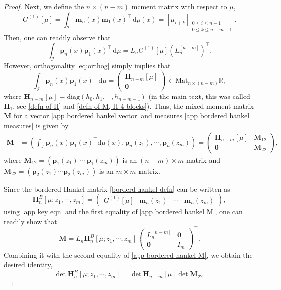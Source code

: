 \documentclass[a4paper,10pt,leqno]{amsart}
\numberwithin{equation}{section}
\theoremstyle{remark}
\newcommand{\dd}{\mathrm{d}}
\newcommand{\R}{\mathbb{R}}
\begin{document}
\begin{proof}
Next, we define the $n \times (n-m)$ moment matrix with respect to $\mu$,
\[
G^{(1)}[\mu] = \int_{\mathscr I} \bm m_n (x)\bm m_{1} (x)^\top\,\dd\mu(x)=[\mu_{i+k}]_{\substack{0\le i\le n-1\\ 0\le k\le n-m-1}}.
\]
Then, one can readily observe that 
\begin{equation} \label{app key eqn}
\int_{\mathscr I} \bm p_n (x) \bm p_{1} (x)^\top \,\dd\mu = L_n G^{(1)}[\mu] \left( L_n^{[n-m]} \right)^\top.
\end{equation}
However, orthogonality \eqref{eq:orthog} simply implies that
\[
\int_{\mathscr I} \bm p_n (x) \bm p_{1} (x)^\top \,\dd\mu = \begin{pmatrix}
    \bm{H}_{n-m}[\mu]\\
    \bm{0}
\end{pmatrix} \in \mathrm{Mat}_{n \times (n-m)} \R,
\]
where \(\bm{H}_{n-m}[\mu] = \mathrm{diag}(h_0, h_1, \cdots, h_{n-m-1})\) (in the main text, this was called $\bm H_1$, see \eqref{defn of H} and \eqref{defn of M, H 4 blocks}).
Thus, the mixed-moment matrix $\bm{M}$ for a vector \eqref{app bordered hankel vector} and measures \eqref{app bordered hankel measures} is given by
\begin{align} \label{app bordered hankel M}
\bm{M} &= \left(\int_{\mathscr I} \bm p_n(x) \bm p_{1}(x)^\top \dd\mu(x), \bm p_n(z_1), \cdots, \bm p_n (z_m) \right) = \begin{pmatrix}
\bm H_{n-m}[\mu] & \bm M_{12} \\[2pt]
\bm 0    & \bm M_{22}
\end{pmatrix},
\end{align}
where $\bm M_{12} = \left(\bm p_1(z_1)\ \cdots\ \bm p_1(z_m)\right)$ is an $(n-m) \times m$ matrix and $\bm M_{22} = \left(\bm p_2(z_1) \cdots \bm p_2(z_m)\right)$ is an $m \times m$ matrix.

Since the bordered Hankel matrix \eqref{borderd hankel defn} can be written as
\[
\bm H_n^{B}[\mu;z_1,\cdots,z_m]
= \begin{pmatrix} G^{(1)}[\mu] & \bm m_n (z_1) & \cdots & \bm m_n (z_m)\end{pmatrix},
\]
using \eqref{app key eqn} and the first equality of \eqref{app bordered hankel M}, one can readily show that
\begin{equation}
\bm{M} = L_n \bm H_n^{B}[\mu;z_1,\cdots,z_m]\
\begin{pmatrix}
L_n^{[n-m]} & \bm 0\\
\bm 0 & I_m
\end{pmatrix}^\top.
\end{equation}
Combining it with the second equality of \eqref{app bordered hankel M}, we obtain the desired identity,
\[
\det\bm H_n^{B}[\mu;z_1,\cdots,z_m]= \det \bm{H}_{n-m}[\mu] \det \bm M_{22}.
\]
\end{proof}
\end{document}
